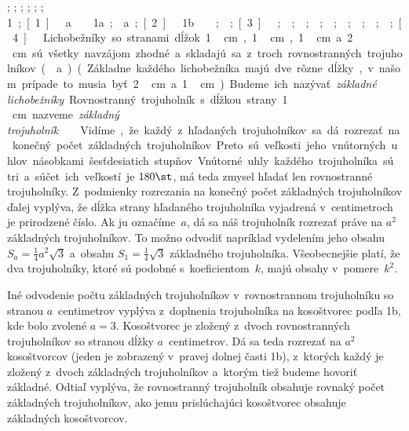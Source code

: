{%
\fontplace
{}; ; ; ; ; ;
\rtpoint{}\unit1;
[1] \hfil\Obr a

\fontplace
\tpoint \vphantom1a; \rBpoint a;
[2] \hfil\Obrr1b\qquad

\fontplace
{}; ;
[3]

\fontplace
{}; ; ;
; ; ;
; ; ;
[4] \hfil\Obr

Lichobežníky so stranami dĺžok 1\,cm, 1\,cm, 1\,cm a~2\,cm
sú všetky navzájom zhodné a~skladajú sa z~troch rovnostranných  
trojuholníkov (\obr a). (Základne každého lichobežníka majú dve
rôzne dĺžky, v~našom prípade to musia byť 2\,cm a~1\,cm.) Budeme
ich nazývať {\it základné lichobežníky}. Rovnostranný trojuholník  
s~dĺžkou strany 1\,cm nazveme {\it základný trojuholník}.

\midinsert
\line{\hss\inspicture-!\hss\inspicture-!\kern-12mm\inspicture-!\hss}
\endinsert

Vidíme, že každý z~hľadaných trojuholníkov sa dá rozrezať na konečný
počet základných trojuholníkov. Preto sú veľkosti jeho
vnútorných uhlov násobkami šesťdesiatich stupňov. Vnútorné uhly každého
trojuholníka sú tri a~súčet ich veľkostí je $180\st$, má
teda zmysel hľadať len rovnostranné trojuholníky. Z~podmienky
rozrezania na konečný počet základných trojuholníkov ďalej vyplýva, že
dĺžka strany hľadaného trojuholníka vyjadrená v~centimetroch je
prirodzené číslo. Ak ju označíme~$a$, dá sa náš trojuholník rozrezať
práve na $a^2$ základných trojuholníkov. To možno odvodiť napríklad
vydelením jeho obsahu $S_a=\frac14a^2\sqrt3$ a~obsahu
$S_1=\frac14\sqrt3$ základného trojuholníka. Všeobecnejšie platí, že dva
trojuholníky, ktoré sú podobné s~koeficientom~$k$, majú obsahy
v~pomere~$k^2$.

\inspicture{}

Iné odvodenie počtu základných trojuholníkov v~rovnostrannom
trojuholníku so stranou $a$~centimetrov vyplýva z~doplnenia trojuholníka na
kosoštvorec podľa \obrr1b, kde bolo zvolené $a=3$. Kosoštvorec je
zložený z~dvoch rovnostranných trojuholníkov so stranou dĺžky
$a$~centimetrov. Dá sa teda rozrezať na $a^2$ kosoštvorcov (jeden je
zobrazený v~pravej dolnej časti \obrr1b), z~ktorých každý je zložený
z~dvoch základných trojuholníkov a~ktorým tiež budeme hovoriť
základné. Odtiaľ vyplýva, že rovnostranný trojuholník obsahuje
rovnaký počet základných trojuholníkov, ako jemu prislúchajúci
kosoštvorec obsahuje základných kosoštvorcov.

}
